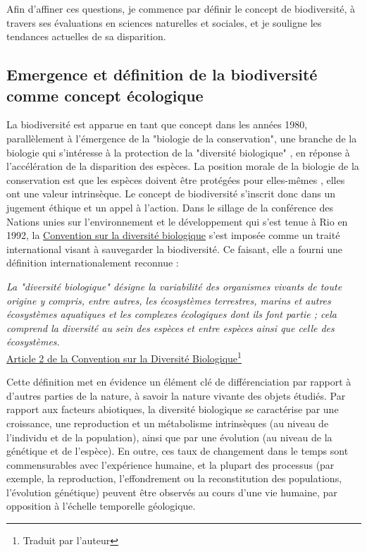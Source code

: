 Afin d'affiner ces questions, je commence par définir le concept de biodiversité, à travers ses évaluations en sciences naturelles et sociales, et je souligne les tendances actuelles de sa disparition.

{}
\subsection*{Emergence et définition de la biodiversité comme concept écologique }


La biodiversité est apparue en tant que concept dans les années 1980, parallèlement à l'émergence de la "biologie de la conservation", une branche de la biologie qui s'intéresse à la protection de la "diversité biologique" \citep{soule_what_1985}, en réponse à l'accélération de la disparition des espèces. La position morale de la biologie de la conservation est que les espèces doivent être protégées pour elles-mêmes \citep{soule_conservation_1986}, elles ont une valeur intrinsèque. 
Le concept de biodiversité s'inscrit donc dans un jugement éthique et un appel à l'action. Dans le sillage de la conférence des Nations unies sur l'environnement et le développement qui s'est tenue à Rio en 1992, la \href{https://www.cbd.int/}{Convention sur la diversité biologique} s'est imposée comme un traité international visant à sauvegarder la biodiversité. Ce faisant, elle a fourni une définition internationalement reconnue :

\begin{displayquote}
\textit{La "diversité biologique" désigne la variabilité des organismes vivants de toute origine y compris, entre autres, les écosystèmes terrestres, marins et autres écosystèmes aquatiques et les complexes écologiques dont ils font partie ; cela comprend la diversité au sein des espèces et entre espèces ainsi que celle des écosystèmes.}\\
\hspace*{\fill} \small{\href{https://www.cbd.int/convention/articles/default.shtml?a=cbd-02}{Article 2 de la Convention sur la Diversité Biologique}}\footnote{Traduit par l'auteur}
\end{displayquote}

Cette définition met en évidence un élément clé de différenciation par rapport à d'autres parties de la nature, à savoir la nature vivante des objets étudiés. Par rapport aux facteurs abiotiques, la diversité biologique se caractérise par une croissance, une reproduction et un métabolisme intrinsèques (au niveau de l'individu et de la population), ainsi que par une évolution (au niveau de la génétique et de l'espèce). En outre, ces taux de changement dans le temps sont commensurables avec l'expérience humaine, et la plupart des processus (par exemple, la reproduction, l'effondrement ou la reconstitution des populations, l'évolution génétique) peuvent être observés au cours d'une vie humaine, par opposition à l'échelle temporelle géologique. 

